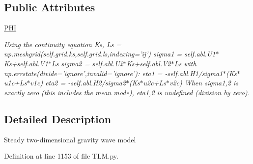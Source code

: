 \subsection*{Public Attributes}
\begin{DoxyCompactItemize}
\item 
\hyperlink{classDropbox_1_1ThreeLayerModel_1_1TLM_1_1S2Dmodel_a8718f789428108d167d7174634a6c845}{P\+H\+I}
\begin{DoxyCompactList}\small\item\em Using the continuity equation Ks, Ls = np.\+meshgrid(self.\+grid.\+ks,self.\+grid.\+ls,indexing='ij') sigma1 = self.\+abl.\+U1$\ast$\+Ks+self.abl.\+V1$\ast$\+Ls sigma2 = self.\+abl.\+U2$\ast$\+Ks+self.abl.\+V2$\ast$\+Ls with np.\+errstate(divide='ignore',invalid='ignore')\+: eta1 = -\/self.\+abl.\+H1/sigma1$\ast$(Ks$\ast$u1c+\+Ls$\ast$v1c) eta2 = -\/self.\+abl.\+H2/sigma2$\ast$(Ks$\ast$u2c+\+Ls$\ast$v2c) When sigma1,2 is exactly zero (this includes the mean mode), eta1,2 is undefined (division by zero). \end{DoxyCompactList}\end{DoxyCompactItemize}


\subsection{Detailed Description}
\begin{DoxyVerb}Steady two-dimensional gravity wave model
\end{DoxyVerb}
 

Definition at line 1153 of file T\+L\+M.\+py.



